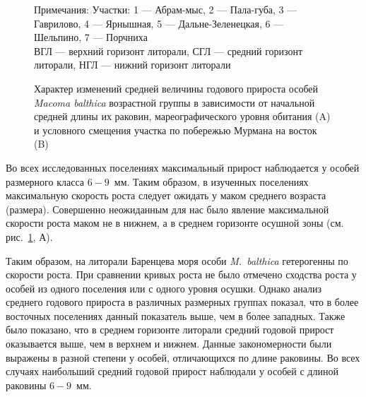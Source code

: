 \begin{figure}[p]
\begin{minipage}[b]{.5\linewidth}
\begin{center}
			\end{center}
		\end{minipage}
	\caption{Характер изменений средней величины годового прироста особей {\it Macoma balthica} возрастной группы в зависимости от начальной средней длины их раковин, мареографического уровня обитания (A) и условного смещения участка по побережью Мурмана на восток (B)}
\footnotesize{Примечания: Участки: 1 --- Абрам-мыс, 2 --- Пала-губа, 3 --- Гаврилово, 4 --- Ярнышная, 5 --- Дальне-Зеленецкая, 6 --- Шельпино, 7 --- Порчниха\\
ВГЛ --- верхний горизонт литорали, СГЛ --- средний горизонт литорали, НГЛ --- нижний горизонт литорали}
	\label{ris:prirost_otklik}
	\end{figure}
Во всех исследованных поселениях максимальный прирост наблюдается у особей размерного класса $6 - 9$~мм. 
Таким образом, в изученных поселениях максимальную скорость роста следует ожидать у маком среднего возраста (размера). 
Совершенно неожиданным для нас было явление максимальной скорости роста маком не в нижнем, а в среднем горизонте осушной зоны (см. рис.~\ref{ris:prirost_otklik}, А). 

\bigskip
Таким образом, на литорали Баренцева моря особи \textit{M.~balthica} гетерогенны по скорости роста.
При сравнении кривых роста не было отмечено сходства роста у особей из одного поселения или с одного уровня осушки. 
Однако анализ среднего годового прироста в различных размерных группах показал, что в более восточных поселениях данный показатель выше, чем в более западных.
Также было показано, что в среднем горизонте литорали средний годовой прирост оказывается выше, чем в верхнем и нижнем.
Данные закономерности были выражены в разной степени у особей, отличающихся по длине раковины.
Во всех случаях наибольший средний годовой прирост наблюдали у особей с длиной раковины $6 - 9$~мм.

\afterpage{\clearpage}
